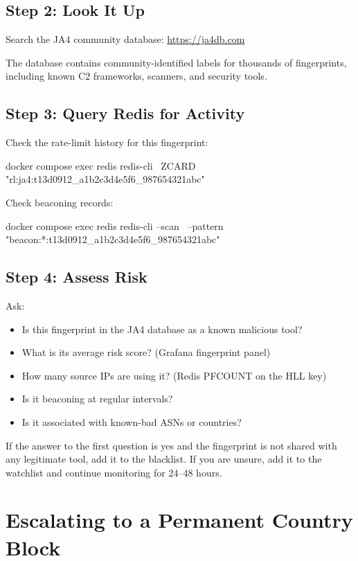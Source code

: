 \subsection{Step 2: Look It Up}

Search the JA4 community database: \url{https://ja4db.com}

The database contains community-identified labels for thousands of fingerprints,
including known C2 frameworks, scanners, and security tools.

\subsection{Step 3: Query Redis for Activity}

Check the rate-limit history for this fingerprint:

\begin{bashcode}
docker compose exec redis redis-cli \
  ZCARD "rl:ja4:t13d0912_a1b2c3d4e5f6_987654321abc"
\end{bashcode}

Check beaconing records:

\begin{bashcode}
docker compose exec redis redis-cli --scan \
  --pattern "beacon:*:t13d0912_a1b2c3d4e5f6_987654321abc"
\end{bashcode}

\subsection{Step 4: Assess Risk}

Ask:
\begin{itemize}
  \item Is this fingerprint in the JA4 database as a known malicious tool?
  \item What is its average risk score? (Grafana fingerprint panel)
  \item How many source IPs are using it? (Redis PFCOUNT on the HLL key)
  \item Is it beaconing at regular intervals?
  \item Is it associated with known-bad ASNs or countries?
\end{itemize}

If the answer to the first question is yes and the fingerprint is not shared with
any legitimate tool, add it to the blacklist. If you are unsure, add it to the
watchlist and continue monitoring for 24--48 hours.

\section{Escalating to a Permanent Country Block}

